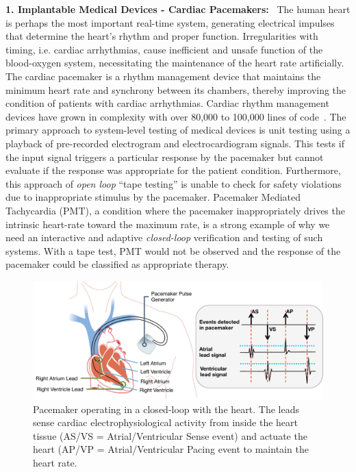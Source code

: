 \textbf{1. Implantable Medical Devices - Cardiac Pacemakers:}
~The human heart is perhaps the most important real-time system, generating electrical impulses that determine the heart's rhythm and proper function. Irregularities with timing, i.e. cardiac arrhythmias, cause inefficient and unsafe function of the blood-oxygen system, necessitating the maintenance of the heart rate artificially. The cardiac pacemaker is a rhythm management device that maintains the minimum heart rate and  synchrony between its chambers, thereby improving the condition of patients with cardiac arrhythmias. Cardiac rhythm management devices have grown in complexity with over 80,000 to 100,000 lines of code~\cite{pauljones}. The primary approach to system-level testing of medical devices is unit testing using a playback of pre-recorded electrogram and electrocardiogram signals. This tests if the input signal triggers a particular response by the pacemaker but cannot evaluate if the response was appropriate for the patient condition. Furthermore, this approach of {\em open loop} ``tape testing'' is unable to check for safety violations due to inappropriate stimulus by the pacemaker. Pacemaker Mediated Tachycardia (PMT), a condition where the pacemaker inappropriately drives the intrinsic heart-rate toward the maximum rate, is a strong example of why we need an interactive and adaptive {\em closed-loop} verification and testing of such systems. With a tape test, PMT would not be observed and the response of the pacemaker could be classified as appropriate therapy.
\begin{figure}[t]
	\centering
	\includegraphics[scale=0.33]{figs/fig1pacemaker.pdf}
	\caption{\small Pacemaker operating in a closed-loop with the heart. The leads sense cardiac electrophysiological activity from inside the heart tissue (AS/VS = Atrial/Ventricular Sense event) and actuate the heart (AP/VP = Atrial/Ventricular Pacing event to maintain the heart rate.}
	\vspace{-20pt}
	\label{fig:pacemaker}
\end{figure}
